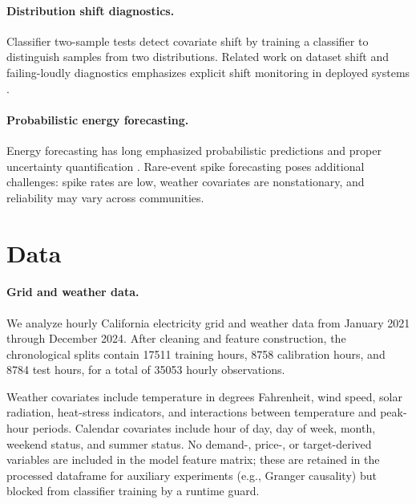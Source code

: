 \documentclass{article}
\begin{document}
\paragraph{Distribution shift diagnostics.}
Classifier two-sample tests \citep{lopezpaz2017} detect covariate shift by
training a classifier to distinguish samples from two distributions. Related
work on dataset shift and failing-loudly diagnostics emphasizes explicit
shift monitoring in deployed systems \citep{quionero2009,rabanser2019}.

\paragraph{Probabilistic energy forecasting.}
Energy forecasting has long emphasized probabilistic predictions and proper
uncertainty quantification \citep{gneiting2007,hong2016}. Rare-event spike
forecasting poses additional challenges: spike rates are low, weather
covariates are nonstationary, and reliability may vary across communities.

\section{Data}
\label{sec:data}

\paragraph{Grid and weather data.}
We analyze hourly California electricity grid and weather data from January
2021 through December 2024. After cleaning and feature construction, the
chronological splits contain \num{17511} training hours, \num{8758}
calibration hours, and \num{8784} test hours, for a total of \num{35053}
hourly observations.

Weather covariates include temperature in degrees Fahrenheit, wind speed,
solar radiation, heat-stress indicators, and interactions between temperature
and peak-hour periods. Calendar covariates include hour of day, day of week,
month, weekend status, and summer status. No demand-, price-, or
target-derived variables are included in the model feature matrix; these are
retained in the processed dataframe for auxiliary experiments (e.g., Granger
causality) but blocked from classifier training by a runtime guard.
\end{document}
